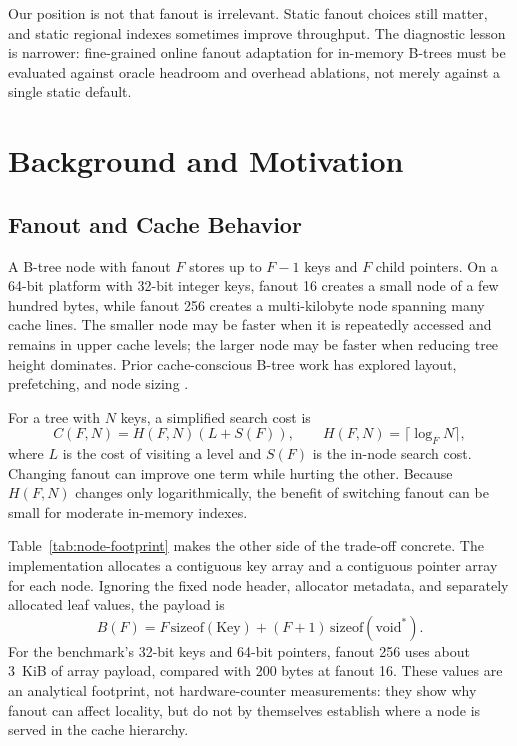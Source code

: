 \documentclass[sigconf,review,anonymous]{acmart}
\begin{document}
Our position is not that fanout is irrelevant.  Static fanout choices still
matter, and static regional indexes sometimes improve throughput.  The
diagnostic lesson is narrower: fine-grained online fanout adaptation for
in-memory B-trees must be evaluated against oracle headroom and overhead
ablations, not merely against a single static default.

\section{Background and Motivation}

\subsection{Fanout and Cache Behavior}

A B-tree node with fanout \(F\) stores up to \(F-1\) keys and \(F\) child
pointers.  On a 64-bit platform with 32-bit integer keys, fanout 16 creates a
small node of a few hundred bytes, while fanout 256 creates a multi-kilobyte
node spanning many cache lines.  The smaller node may be faster when it is
repeatedly accessed and remains in upper cache levels; the larger node may be
faster when reducing tree height dominates.  Prior cache-conscious B-tree work
has explored layout, prefetching, and node sizing
\cite{rao1999cache,rao2000making,chen2001fractal,ailamaki1999dbmson}.

For a tree with \(N\) keys, a simplified search cost is
\[
  C(F,N) = H(F,N)(L + S(F)),
  \qquad H(F,N)=\lceil \log_F N\rceil ,
\]
where \(L\) is the cost of visiting a level and \(S(F)\) is the in-node search
cost.  Changing fanout can improve one term while hurting the other.  Because
\(H(F,N)\) changes only logarithmically, the benefit of switching fanout can be
small for moderate in-memory indexes.

Table~\ref{tab:node-footprint} makes the other side of the trade-off concrete.
The implementation allocates a contiguous key array and a contiguous pointer
array for each node.  Ignoring the fixed node header, allocator metadata, and
separately allocated leaf values, the payload is
\[
  B(F) = F\,\mathrm{sizeof(Key)} + (F+1)\,\mathrm{sizeof(void^*)}.
\]
For the benchmark's 32-bit keys and 64-bit pointers, fanout 256 uses about
3~KiB of array payload, compared with 200 bytes at fanout 16.  These values are
an analytical footprint, not hardware-counter measurements: they show why
fanout can affect locality, but do not by themselves establish where a node is
served in the cache hierarchy.
\end{document}
